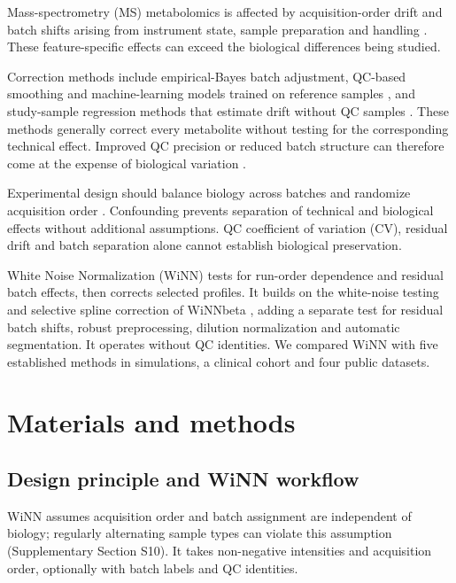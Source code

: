 \documentclass[namedate,webpdf,modern,large,nocrop]{oup-authoring-template}
\begin{document}
Mass-spectrometry (MS) metabolomics is affected by acquisition-order drift and batch shifts arising from instrument state, sample preparation and handling \citep{Dunn2011,Brunius2016ClusterDrift,Wehrens2016BatchCorr}. These feature-specific effects can exceed the biological differences being studied.

Correction methods include empirical-Bayes batch adjustment, QC-based smoothing and machine-learning models trained on reference samples \citep{Johnson2007ComBat,Luan2018StatTarget,Fan2019SERRF,Han2022TIGER}, and study-sample regression methods that estimate drift without QC samples \citep{Wehrens2016BatchCorr,Rusilowicz2016Background}. These methods generally correct every metabolite without testing for the corresponding technical effect. Improved QC precision or reduced batch structure can therefore come at the expense of biological variation \citep{Kim2021hRUV}.

Experimental design should balance biology across batches and randomize acquisition order \citep{Dunn2011,Jonsson2015}. Confounding prevents separation of technical and biological effects without additional assumptions. QC coefficient of variation (CV), residual drift and batch separation alone cannot establish biological preservation.

White Noise Normalization (WiNN) tests for run-order dependence and residual batch effects, then corrects selected profiles. It builds on the white-noise testing and selective spline correction of WiNNbeta \citep{Demler2024WiNNbeta}, adding a separate test for residual batch shifts, robust preprocessing, dilution normalization and automatic segmentation. It operates without QC identities. We compared WiNN with five established methods in simulations, a clinical cohort and four public datasets.

\section{Materials and methods}
\label{sec:methods}

\subsection{Design principle and WiNN workflow}

WiNN assumes acquisition order and batch assignment are independent of biology; regularly alternating sample types can violate this assumption (Supplementary Section S10). It takes non-negative intensities and acquisition order, optionally with batch labels and QC identities.
\end{document}
